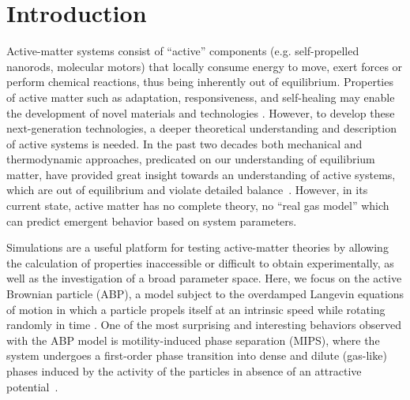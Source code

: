 \documentclass[twoside,twocolumn,9pt]{article}
\begin{document}



\section{Introduction}
Active-matter systems consist of ``active'' components (e.g. self-propelled nanorods, molecular motors) that locally consume energy to move, exert forces or perform chemical reactions, thus being inherently out of equilibrium. Properties of active matter such as adaptation, responsiveness, and self-healing may enable the development of novel materials and technologies \cite{Ghosh2013, Palacci2010, VanDerMeer2016, Ghosh2020, Patterson2010, Brambilla2013, Gao2013, Orozco2014, Li2017, Li2014, Perez2014, Chen2015}. However, to develop these next-generation technologies, a deeper theoretical understanding and description of active systems is needed. In the past two decades both mechanical and thermodynamic approaches, predicated on our understanding of equilibrium matter, have provided great insight towards an understanding of active systems, which are out of equilibrium and violate detailed balance~\cite{Cates2012DiffusivePhysics,Marchetti2016MinimalMatter,Battle2016BrokenSystems,Fodor2016HowMatter,Stenhammar2014, Kolb2020ActiveSpheres}. However, in its current state, active matter has no complete theory, no ``real gas model'' which can predict emergent behavior based on system parameters.

Simulations are a useful platform for testing active-matter theories by allowing the calculation of properties inaccessible or difficult to obtain experimentally, as well as the investigation of a broad parameter space. Here, we focus on the active Brownian particle (ABP), a model subject to the overdamped Langevin equations of motion in which a particle propels itself at an intrinsic speed while rotating randomly in time \cite{Schimansky-Geier1995, Redner2013, Cates2015a}. One of the most surprising and interesting behaviors observed with the ABP model is motility-induced phase separation (MIPS), where the system undergoes a first-order phase transition into dense and dilute (gas-like) phases induced by the activity of the particles in absence of an attractive potential~\cite{Redner2013, Cates2015a}. 
\end{document}
